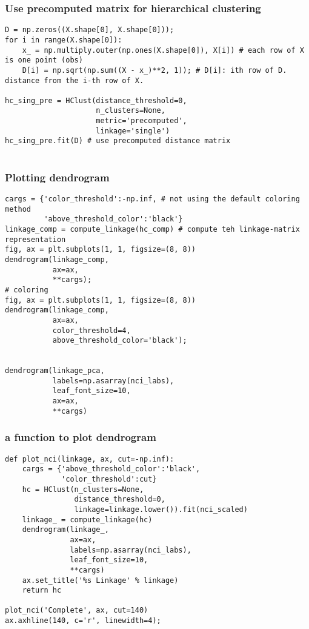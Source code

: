 \documentclass[
  letterpaper,
  DIV=11,
  numbers=noendperiod]{scrreprt}
\begin{document}
\subsubsection{Use precomputed matrix for hierarchical
clustering}\label{use-precomputed-matrix-for-hierarchical-clustering}

\begin{verbatim}
D = np.zeros((X.shape[0], X.shape[0]));
for i in range(X.shape[0]):
    x_ = np.multiply.outer(np.ones(X.shape[0]), X[i]) # each row of X is one point (obs)
    D[i] = np.sqrt(np.sum((X - x_)**2, 1)); # D[i]: ith row of D. distance from the i-th row of X.
    
hc_sing_pre = HClust(distance_threshold=0,
                     n_clusters=None,
                     metric='precomputed',
                     linkage='single')
hc_sing_pre.fit(D) # use precomputed distance matrix
    
\end{verbatim}

\subsubsection{Plotting dendrogram}\label{plotting-dendrogram}

\begin{verbatim}
cargs = {'color_threshold':-np.inf, # not using the default coloring method
         'above_threshold_color':'black'}
linkage_comp = compute_linkage(hc_comp) # compute teh linkage-matrix representation
fig, ax = plt.subplots(1, 1, figsize=(8, 8))
dendrogram(linkage_comp,
           ax=ax,
           **cargs);
# coloring           
fig, ax = plt.subplots(1, 1, figsize=(8, 8))
dendrogram(linkage_comp,
           ax=ax,
           color_threshold=4,
           above_threshold_color='black');


dendrogram(linkage_pca,
           labels=np.asarray(nci_labs),
           leaf_font_size=10,
           ax=ax,
           **cargs)
\end{verbatim}

\subsubsection{a function to plot
dendrogram}\label{a-function-to-plot-dendrogram}

\begin{verbatim}
def plot_nci(linkage, ax, cut=-np.inf):
    cargs = {'above_threshold_color':'black',
             'color_threshold':cut}
    hc = HClust(n_clusters=None,
                distance_threshold=0,
                linkage=linkage.lower()).fit(nci_scaled)
    linkage_ = compute_linkage(hc)
    dendrogram(linkage_,
               ax=ax,
               labels=np.asarray(nci_labs),
               leaf_font_size=10,
               **cargs)
    ax.set_title('%s Linkage' % linkage)
    return hc
    
plot_nci('Complete', ax, cut=140)
ax.axhline(140, c='r', linewidth=4);
    
\end{verbatim}
\end{document}
